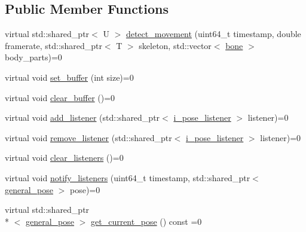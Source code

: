 \subsection*{Public Member Functions}
\begin{DoxyCompactItemize}
\item 
virtual std\-::shared\-\_\-ptr$<$ U $>$ \hyperlink{classmae_1_1i__movement__detector_aa3b5c4491ce4f11ef6a116ba05084f1a}{detect\-\_\-movement} (uint64\-\_\-t timestamp, double framerate, std\-::shared\-\_\-ptr$<$ T $>$ skeleton, std\-::vector$<$ \hyperlink{classmae_1_1bone}{bone} $>$ body\-\_\-parts)=0
\item 
virtual void \hyperlink{classmae_1_1i__movement__detector_a96a923c5bab2dbed81daf4cadc885497}{set\-\_\-buffer} (int size)=0
\item 
virtual void \hyperlink{classmae_1_1i__movement__detector_a73db186e7b58daa0923f00b285671172}{clear\-\_\-buffer} ()=0
\item 
virtual void \hyperlink{classmae_1_1i__movement__detector_af6724fa4c8ddb032411825168e4b02d4}{add\-\_\-listener} (std\-::shared\-\_\-ptr$<$ \hyperlink{classmae_1_1i__pose__listener}{i\-\_\-pose\-\_\-listener} $>$ listener)=0
\item 
virtual void \hyperlink{classmae_1_1i__movement__detector_a88d965f2b8d04e0681e2e7cd42bd7331}{remove\-\_\-listener} (std\-::shared\-\_\-ptr$<$ \hyperlink{classmae_1_1i__pose__listener}{i\-\_\-pose\-\_\-listener} $>$ listener)=0
\item 
virtual void \hyperlink{classmae_1_1i__movement__detector_a56a36a8a427feb34f970b9e259a1150f}{clear\-\_\-listeners} ()=0
\item 
virtual void \hyperlink{classmae_1_1i__movement__detector_aebdc95347866bc2bc6b793383585fe2f}{notify\-\_\-listeners} (uint64\-\_\-t timestamp, std\-::shared\-\_\-ptr$<$ \hyperlink{classmae_1_1general__pose}{general\-\_\-pose} $>$ pose)=0
\item 
virtual std\-::shared\-\_\-ptr\\*
$<$ \hyperlink{classmae_1_1general__pose}{general\-\_\-pose} $>$ \hyperlink{classmae_1_1i__movement__detector_a67db28512cb293217156fd8611322d75}{get\-\_\-current\-\_\-pose} () const =0
\end{DoxyCompactItemize}


